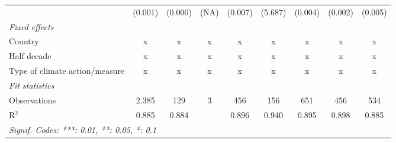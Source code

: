 \begin{table}[htbp]
\begin{tabular}{lcccccccc}
                                                                  & (0.001)       & (0.000)                   & (NA)         & (0.007)        & (5.687)          & (0.004)         & (0.002)         & (0.005)\\   
      \emph{Fixed effects}\\
      Country                                                     & x             & x                         & x            & x              & x                & x               & x               & x\\  
      Half decade                                                 & x             & x                         & x            & x              & x                & x               & x               & x\\  
      Type of climate action/measure                              & x             & x                         & x            & x              & x                & x               & x               & x\\  
      \midrule \emph{Fit statistics}\\
      Observations                                                & 2,385         & 129                       & 3            & 456            & 156              & 651             & 456             & 534\\  
      R$^2$                                                       & 0.885         & 0.884                     &              & 0.896          & 0.940            & 0.895           & 0.898           & 0.885\\  
      \midrule
      \multicolumn{9}{l}{\emph{Signif. Codes: ***: 0.01, **: 0.05, *: 0.1}}\\
   \end{tabular}
\end{table}


